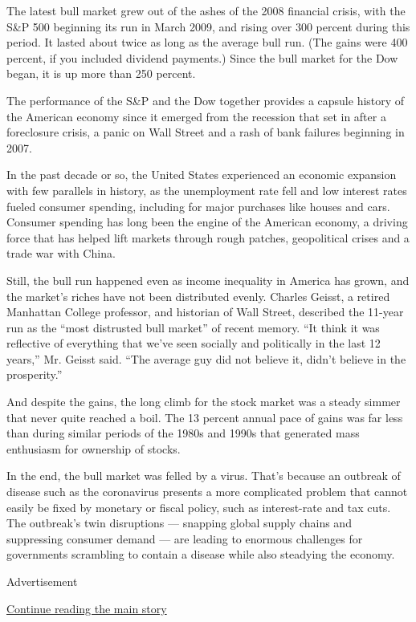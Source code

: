 The latest bull market grew out of the ashes of the 2008 financial
crisis, with the S\&P 500 beginning its run in March 2009, and rising
over 300 percent during this period. It lasted about twice as long as
the average bull run. (The gains were 400 percent, if you included
dividend payments.) Since the bull market for the Dow began, it is up
more than 250 percent.

The performance of the S\&P and the Dow together provides a capsule
history of the American economy since it emerged from the recession that
set in after a foreclosure crisis, a panic on Wall Street and a rash of
bank failures beginning in 2007.

In the past decade or so, the United States experienced an economic
expansion with few parallels in history, as the unemployment rate fell
and low interest rates fueled consumer spending, including for major
purchases like houses and cars. Consumer spending has long been the
engine of the American economy, a driving force that has helped lift
markets through rough patches, geopolitical crises and a trade war with
China.

Still, the bull run happened even as income inequality in America has
grown, and the market's riches have not been distributed evenly. Charles
Geisst, a retired Manhattan College professor, and historian of Wall
Street, described the 11-year run as the ``most distrusted bull market''
of recent memory. ``It think it was reflective of everything that we've
seen socially and politically in the last 12 years,'' Mr. Geisst said.
``The average guy did not believe it, didn't believe in the
prosperity.''

And despite the gains, the long climb for the stock market was a steady
simmer that never quite reached a boil. The 13 percent annual pace of
gains was far less than during similar periods of the 1980s and 1990s
that generated mass enthusiasm for ownership of stocks.

In the end, the bull market was felled by a virus. That's because an
outbreak of disease such as the coronavirus presents a more complicated
problem that cannot easily be fixed by monetary or fiscal policy, such
as interest-rate and tax cuts. The outbreak's twin disruptions ---
snapping global supply chains and suppressing consumer demand --- are
leading to enormous challenges for governments scrambling to contain a
disease while also steadying the economy.

Advertisement

\protect\hyperlink{after-bottom}{Continue reading the main story}

